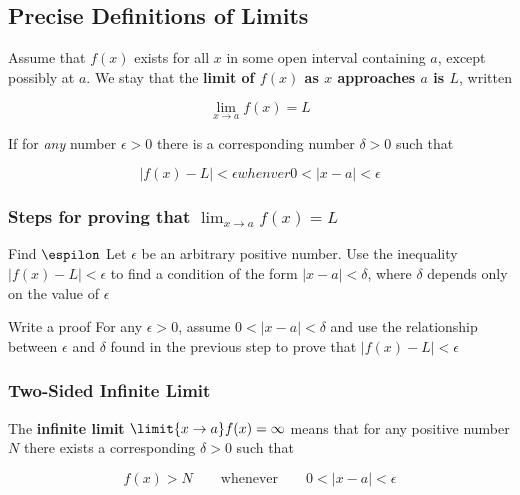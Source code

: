 %
%
%

\subsection{Precise Definitions of Limits}
Assume that $f(x)$ exists for all $x$ in some open interval containing $a$, except possibly at $a$. We stay that the \textbf{limit of $f(x)$ as $x$ approaches $a$ is $L$}, written

\begin{equation}
    \lim_{x \rightarrow a} f(x) = L
\end{equation}

If for \textit{any} number $\epsilon > 0$ there is a corresponding number $\delta > 0$ such that

\begin{equation}
    |f(x) - L| < \epsilon whenver 0 < |x - a| < \epsilon 
\end{equation}

\subsubsection{Steps for proving that $\lim_{x \rightarrow a} f(x) = L$}

\begin{enumdescript}
    \item[Find $\espilon$] Let $\epsilon$ be an arbitrary positive number. Use the inequality $|f(x) - L| < \epsilon$ to find a condition of the form $|x - a| < \delta$, where $\delta$ depends only on the value of $\epsilon$
    \item[Write a proof] For any $\epsilon > 0$, assume $0 < |x - a| < \delta$ and use the relationship between $\epsilon$ and $\delta$ found in the previous step to prove that $|f(x) - L| < \epsilon$
\end{enumdescript}

\subsubsection{Two-Sided Infinite Limit}
The \textbf{infinite limit} $\limit{x \rightarrow a} f(x) = \infty$ means that for any positive number $N$ there exists a corresponding $\delta > 0$ such that

\begin{equation}
    f(x) > N \qquad\text{whenever}\qquad 0 < |x - a| < \epsilon
\end{equation}

